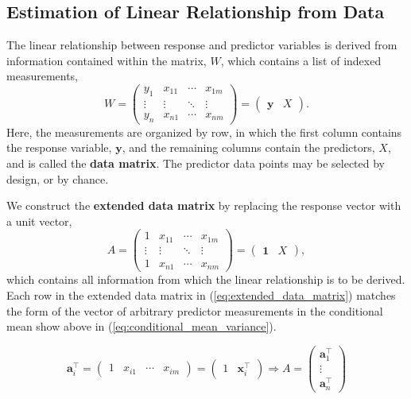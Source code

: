 \documentclass[12pt, twoside, draft]{article}
\begin{document}
\subsection{Estimation of Linear Relationship from Data}
The linear relationship between response and predictor variables is derived from information contained within the matrix, $W$, which contains a list of indexed measurements,
\begin{equation}
W = \begin{pmatrix} y_1 & x_{11} & \cdots & x_{1m} \\
\vdots & \vdots & \ddots & \vdots \\
y_n & x_{n1} & \cdots & x_{nm} \end{pmatrix} =
\begin{pmatrix}  \mathbf{y} & X \end{pmatrix}.
\end{equation}
Here, the measurements are organized by row, in which the first column contains the response variable, $\mathbf{y}$, and the remaining columns contain the predictors, $X$, and is called the \textbf{data matrix}.  The predictor data points may be selected by design, or by chance.

We construct the \textbf{extended data matrix} by replacing the response vector with a unit vector, 
\begin{equation}\label{eq:extended_data_matrix}
A = \begin{pmatrix} 1 & x_{11} & \cdots & x_{1m} \\
\vdots & \vdots & \ddots & \vdots \\
1 & x_{n1} & \cdots & x_{nm} \end{pmatrix} =
\begin{pmatrix}  \mathbf{1} & X \end{pmatrix},
\end{equation}
which contains all information from which the linear relationship is to be derived.  Each row in the extended data matrix in (\ref{eq:extended_data_matrix}) matches the form of the vector of arbitrary predictor measurements in the conditional mean show above in (\ref{eq:conditional_mean_variance}).

\begin{equation}
\mathbf{a}_i^\top = \begin{pmatrix} 1 & x_{i1} & \cdots & x_{im}  \end{pmatrix} = \begin{pmatrix} 1 & \mathbf{x}^\top_i \end{pmatrix} \Rightarrow
A = \begin{pmatrix} \mathbf{a}^\top_1 \\ \vdots \\ \mathbf{a}^\top_n \end{pmatrix}
\end{equation}
\end{document}

